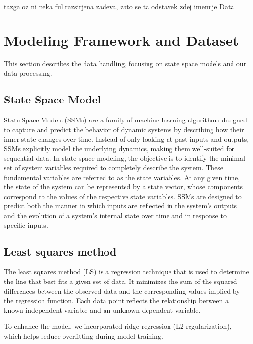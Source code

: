 \documentclass[sigconf,natbib=false, language=english]{acmart}
\begin{document}
tazga oz ni neka ful razsirjena zadeva, zato se ta odstavek zdej imenuje Data

\section{Modeling Framework and Dataset}\label{sec:data}
This section describes the data handling, focusing on state space models and our 
data processing.

\subsection{State Space Model}\label{subsec:ssm}
State Space Models (SSMs) are a family of machine learning algorithms designed to 
capture and predict the behavior of dynamic systems by describing how their inner 
state changes over time.  
Instead of only looking at past inputs and outputs, SSMs explicitly model the 
underlying dynamics, making them well-suited for sequential data. In state space modeling, 
the objective is to identify the minimal set of system variables required to completely 
describe the system. These fundamental variables are referred to as the state variables. 
At any given time, the state of the system can be represented by a state vector, 
whose components correspond to the values of the respective state variables. 
SSMs are designed to predict both the manner in which inputs are reflected in the 
system's outputs and the evolution of a system's internal state over time and in 
response to specific inputs. \cite{aoki1990state}

\subsection{Least squares method}

The least squares method (LS) is a regression technique that is used to 
determine the line that best fits a given set of data. It minimizes the sum 
of the squared differences between the observed data and the corresponding 
values implied by the regression function. Each data point reflects the relationship 
between a known independent variable and an unknown dependent variable. \cite{Plestenjak_NUM}

To enhance the model, we incorporated ridge regression (L2 regularization), which 
helps reduce overfitting during model training. \cite{vanWieringen2015ridge}
\end{document}

